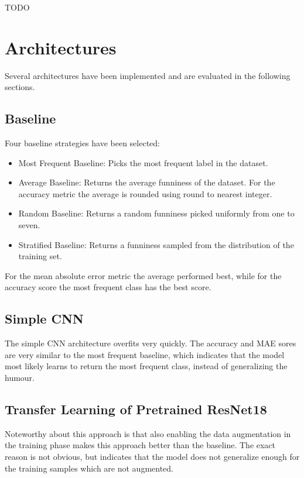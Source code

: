 \documentclass[draft,final,oneside]{vutinfth} %
\begin{document}
TODO

\section{Architectures}
Several architectures have been implemented and are evaluated in the following sections.


\subsection{Baseline}

Four baseline strategies have been selected: 

\begin{itemize}

\item Most Frequent Baseline: Picks the most frequent label in the dataset.
\item Average Baseline: Returns the average funniness of the dataset. For the accuracy metric the average is rounded using round to nearest integer.
\item Random Baseline: Returns a random funniness picked uniformly from one to seven.
\item Stratified Baseline: Returns a funniness sampled from the distribution of the
training set.

\end{itemize}

For the mean absolute error metric the average performed best, while for the accuracy
score the most frequent class has the best score.

\subsection{Simple CNN}
The simple CNN architecture overfits very quickly. The accuracy and MAE sores are
very similar to the most frequent baseline, which indicates that the model most likely
learns to return the most frequent class, instead of generalizing the humour.

\subsection{Transfer Learning of Pretrained ResNet18}
Noteworthy about this approach is that also enabling the data augmentation in the
training phase makes this approach better than the baseline. The exact reason is not
obvious, but indicates that the model does not generalize enough for the
training samples which are not augmented.
\end{document}
